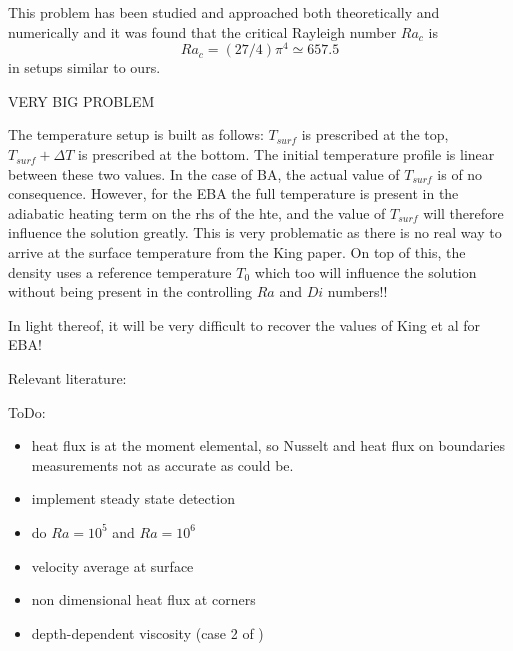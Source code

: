 This problem has been studied and approached both theoretically and numerically \cite[e.g.]{tusc} and it was found that
the critical Rayleigh number $Ra_c$ is 
\[
Ra_c=(27/4)\pi^4 \simeq 657.5
\]
in setups similar to ours.


\vspace{3cm}



{\color{red} VERY BIG PROBLEM}

The temperature setup is built as follows: $T_{surf}$ is prescribed at the top, 
$T_{surf}+\Delta T$ is prescribed at the bottom. The initial temperature profile is linear between these two values. 
In the case of BA, the actual value of $T_{surf}$ is of no consequence. However, for the EBA the full temperature is present in the adiabatic heating term on the rhs of the hte, and the value of $T_{surf}$ will therefore influence the solution greatly. This is very problematic as there is no real way to arrive at the surface temperature from the King paper. On top of this, the density uses a reference temperature $T_0$ which too will influence the solution without being present in the controlling $Ra$ and $Di$ numbers!!

In light thereof, it will be very difficult to recover the values of King et al for EBA!

\vspace{3cm}


Relevant literature: \cite{besg92,itki94,tagu07,lezh08,kilv10,lezh11,lizh13,hedg17}


ToDo: 
\begin{itemize}
\item heat flux is at the moment elemental, so Nusselt and heat flux on boundaries measurements not as accurate as could be.
\item implement steady state detection
\item do $Ra=10^5$ and $Ra=10^6$
\item velocity average at surface
\item non dimensional heat flux at corners \cite{blbc89} 
\item depth-dependent viscosity (case 2 of \cite{blbc89})
\end{itemize}

